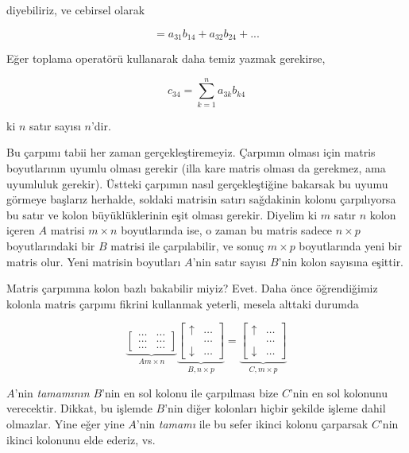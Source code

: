 \documentclass[12pt,fleqn]{article}\usepackage{../../common}
\begin{document}
diyebiliriz, ve cebirsel olarak

$$ = a_{31}b_{14} + a_{32}b_{24} + ... $$

Eğer toplama operatörü kullanarak daha temiz yazmak gerekirse,

$$ c_{34} = \sum_{k=1}^{n} a_{3k}b_{k4} $$ 

ki $n$ satır sayısı $n$'dir. 

Bu çarpımı tabii her zaman gerçekleştiremeyiz. Çarpımın olması için matris
boyutlarının uyumlu olması gerekir (illa kare matris olması da gerekmez,
ama uyumluluk gerekir). Üstteki çarpımın nasıl gerçekleştiğine bakarsak bu
uyumu görmeye başlarız herhalde, soldaki matrisin satırı sağdakinin kolonu
çarpılıyorsa bu satır ve kolon büyüklüklerinin eşit olması gerekir. Diyelim
ki $m$ satır $n$ kolon içeren $A$ matrisi $m \times n$ boyutlarında ise, o
zaman bu matris sadece $n \times p$ boyutlarındaki bir $B$ matrisi ile
çarpılabilir, ve sonuç $m \times p$ boyutlarında yeni bir matris
olur. Yeni matrisin boyutları $A$'nin satır sayısı $B$'nin kolon sayısına
eşittir. 

Matris çarpımına kolon bazlı bakabilir miyiz? Evet. Daha önce öğrendiğimiz
kolonla matris çarpımı fikrini kullanmak yeterli, mesela alttaki durumda

$$ 
\underbrace{
\left[\begin{array}{rr}
\dots & \dots   \\
\dots & \dots   \\
\dots & \dots 
\end{array}\right]
}_{A m \times n}
\underbrace{
\left[\begin{array}{rr}
\uparrow &  \dots\\
&  \dots\\
\downarrow & \dots 
\end{array}\right] 
}_{B, n \times p}
=
\underbrace{
\left[\begin{array}{rr}
\uparrow &  \dots \\
&  \dots \\
\downarrow & \dots
\end{array}\right] 
}_{C, m \times p}
$$

$A$'nin {\em tamamının} $B$'nin en sol kolonu ile çarpılması bize $C$'nin
en sol kolonunu verecektir. Dikkat, bu işlemde $B$'nin diğer kolonları
hiçbir şekilde işleme dahil olmazlar. Yine eğer yine $A$'nin {\em tamamı}
ile bu sefer ikinci kolonu çarparsak $C$'nin ikinci kolonunu elde ederiz,
vs.
\end{document}
